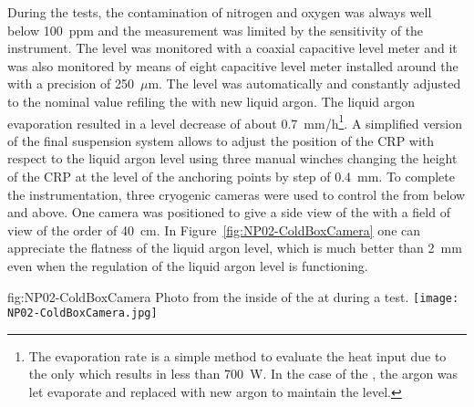 During the tests, the contamination of nitrogen and oxygen was always well below 100~ppm and the measurement was limited by the sensitivity of the instrument.
The level was monitored with a coaxial capacitive level meter and it was also monitored by means of eight capacitive level meter installed around the  with a precision of 250~$\mu$m.
The level was automatically and constantly adjusted to the nominal value refiling the  \coldbox with new liquid argon.
The liquid argon evaporation resulted in a level decrease of about 0.7~mm/h\footnote{The evaporation rate is a simple method to evaluate the heat input due to the  \coldbox only which results in less than 700~W. In the case of the   \coldbox, the argon was let evaporate and replaced with new argon to maintain the level.}.
A simplified version of the  final suspension system allows to adjust the position of the CRP with respect to the liquid argon level using three manual winches changing the height of the CRP at the level of the anchoring points by step of 0.4~mm.
To complete the  \coldbox instrumentation, three cryogenic cameras were used to control the  from below and above.
One camera was positioned to give a side view of the  with a field of view of the order of 40~cm.
In Figure~\ref{fig:NP02-ColdBoxCamera} one can appreciate the flatness of the liquid argon level, which is much better than 2~mm even when the regulation of the liquid argon level is functioning.
\begin{dunefigure}{fig:NP02-ColdBoxCamera}
{Photo from the inside of the  \coldbox at  during a  test.}
\texttt{[image: NP02-ColdBoxCamera.jpg]}
\end{dunefigure}

